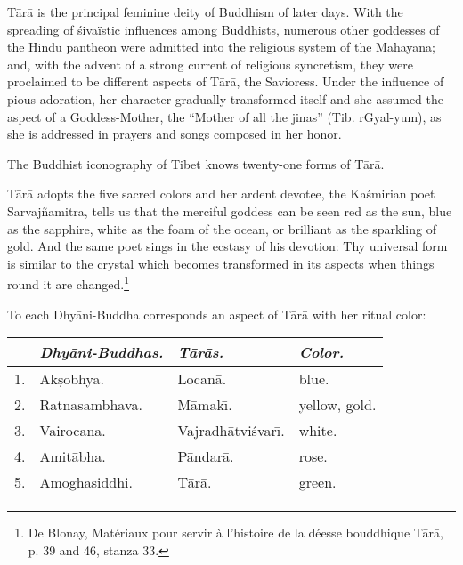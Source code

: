 \documentclass[a4paper, 12pt, oneside]{article}
\begin{document}
T\={a}r\={a} is the principal feminine deity of Buddhism of later days. With the spreading of \'{s}ivaïstic influences among Buddhists, numerous other goddesses of the Hindu pantheon were admitted into the religious system of the Mah\={a}y\={a}na; and, with the advent of a strong current of religious syncretism, they were proclaimed to be different aspects of T\={a}r\={a}, the Savioress. Under the influence of pious adoration, her character gradually transformed itself and she assumed the aspect of a Goddess-Mother, the ``Mother of all the jinas'' (Tib. rGyal-yum), as she is addressed in prayers and songs composed in her honor.

The Buddhist iconography of Tibet knows twenty-one forms of T\={a}r\={a}.

T\={a}r\={a} adopts the five sacred colors and her ardent devotee, the Ka\'{s}mirian poet Sarvaj\~{n}amitra, tells us that the merciful goddess can be seen red as the sun, blue as the sapphire, white as the foam of the ocean, or brilliant as the sparkling of gold. And the same poet sings in the ecstasy of his devotion: Thy universal form is similar to the crystal which becomes transformed in its aspects when things round it are changed.\footnote{De Blonay, Matériaux pour servir à l'histoire de la déesse bouddhique T\={a}r\={a}, p. 39 and 46, stanza 33.}

To each Dhy\={a}ni-Buddha corresponds an aspect of T\={a}r\={a} with her ritual color:

\begin{table}[H]
    \small
    \centering
    \begin{tabular}{l l l l}
        ~ &  \emph{Dhy\={a}ni-Buddhas.}  &  \emph{T\={a}r\={a}s.}             &  \emph{Color.}         \\ \hline
        1. &  Ak\d{s}obhya.        &  Locan\={a}.            &  blue.          \\
        2. &  Ratnasambhava.   &  M\={a}mak\={\i}.            &  yellow, gold.  \\
        3. &  Vairocana.       &  Vajradh\={a}tvi\'{s}var\={\i}.  &  white.         \\
        4. &  Amit\={a}bha.        &  P\={a}ndar\={a}.           &  rose.          \\
        5. &  Amoghasiddhi.    &  T\={a}r\={a}.              &  green. \\
    \end{tabular}
\end{table}
\end{document}
